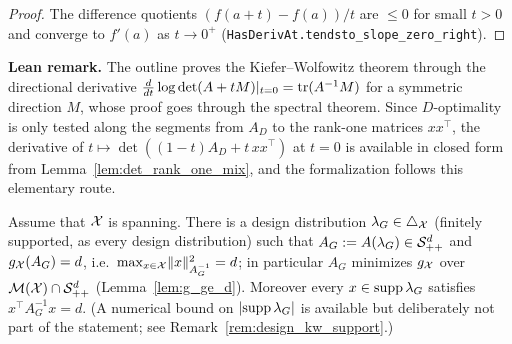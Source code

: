 \begin{proof}
\leanok
The difference quotients $(f(a+t) - f(a))/t$ are $\le 0$ for small $t > 0$ and converge to
$f'(a)$ as $t \to 0^+$ (\texttt{HasDerivAt.tendsto\_slope\_zero\_right}).
\end{proof}

\textbf{Lean remark.} The outline proves the Kiefer--Wolfowitz theorem through the directional
derivative $\frac{d}{dt}\log\det(A + tM)|_{t=0} = \operatorname{tr}(A^{-1}M)$ for a symmetric direction $M$,
whose proof goes through the spectral theorem. Since $D$-optimality is only tested along the
segments from $A_D$ to the rank-one matrices $xx^\top$, the derivative of
$t \mapsto \det((1-t)A_D + t\,xx^\top)$ at $t = 0$ is available in closed form from
Lemma~\ref{lem:det_rank_one_mix}, and the formalization follows this elementary route.

\begin{theorem}\label{thm:kiefer_wolfowitz}
\leanok
{}
Assume that $\mathcal{X}$ is spanning. There is a design distribution $\lambda_G \in \triangle_{\mathcal{X}}$
(finitely supported, as every design distribution) such that $A_G := A(\lambda_G)
\in \mathcal{S}_{++}^{d}$ and $g_{\mathcal{X}}(A_G) = d$, i.e.\ $\max_{x\in\mathcal{X}}\lVert x \rVert_{A_G^{-1}}^2 = d$; in particular
$A_G$ minimizes $g_{\mathcal{X}}$ over $\mathcal{M}(\mathcal{X})\cap\mathcal{S}_{++}^{d}$ (Lemma~\ref{lem:g_ge_d}). Moreover every
$x \in \operatorname{supp}\lambda_G$ satisfies $x^\top A_G^{-1} x = d$. (A numerical bound on
$\lvert \operatorname{supp}\lambda_G \rvert$ is available but deliberately not part of the statement; see
Remark~\ref{rem:design_kw_support}.)
\end{theorem}

